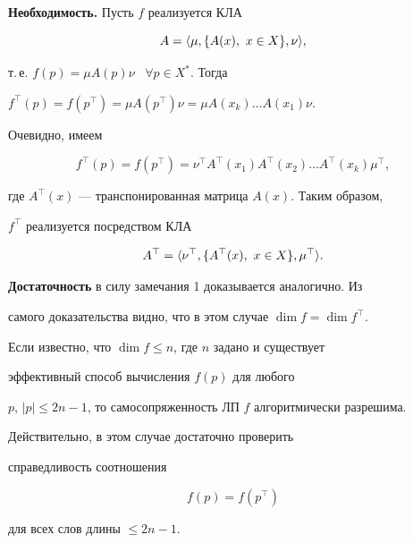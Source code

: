 \begin{pf}


{\bf Необходимость.} Пусть $f$ реализуется КЛА


$$


A=\la\mu,\{A(x),\ x\in X\},\nu\ra,


$$


т.\,е. $f(p)=\mu A(p)\nu$ \ $\forall p\in X^*$. Тогда


$f^\top(p)=f(p^\top)=\mu A(p^\top)\nu=\mu A(x_k)


\dotsc A(x_1)\nu$.


Очевидно, имеем


$$


f^\top(p)=f(p^\top)=\nu^\top A^\top(x_1)A^\top(x_2)\dotsc


A^\top (x_k)\mu^\top,


$$


где $A^\top(x)$ --- транспонированная матрица $A(x)$. Таким образом,


$f^\top$ реализуется посредством КЛА


$$


A^\top=\la\nu^\top,\{A^\top(x),\ x\in X\},\mu^\top\ra.


$$





{\bf Достаточность} в силу замечания 1 доказывается аналогично. Из


самого доказательства видно, что в этом случае $\dim f=\dim f^\top$.


\end{pf}





\begin{thm}


Если известно, что $\dim f\le n$, где $n$ задано и существует 


эффективный способ вычисления $f(p)$ для любого


$p$, $|p|\le2n-1$, то самосопряженность ЛП $f$ алгоритмически разрешима.


\end{thm}





\begin{pf}


Действительно, в этом случае достаточно проверить 


справедливость соотношения


$$


f(p)=f(p^\top)


$$


для всех слов длины $\le2n-1$.


\end{pf}





